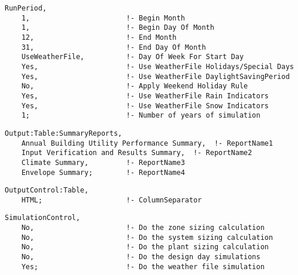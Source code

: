\begin{lstlisting}
RunPeriod,
    1,                       !- Begin Month
    1,                       !- Begin Day Of Month
    12,                      !- End Month
    31,                      !- End Day Of Month
    UseWeatherFile,          !- Day Of Week For Start Day
    Yes,                     !- Use WeatherFile Holidays/Special Days
    Yes,                     !- Use WeatherFile DaylightSavingPeriod
    No,                      !- Apply Weekend Holiday Rule
    Yes,                     !- Use WeatherFile Rain Indicators
    Yes,                     !- Use WeatherFile Snow Indicators
    1;                       !- Number of years of simulation
\end{lstlisting}

\begin{lstlisting}
Output:Table:SummaryReports,
    Annual Building Utility Performance Summary,  !- ReportName1
    Input Verification and Results Summary,  !- ReportName2
    Climate Summary,         !- ReportName3
    Envelope Summary;        !- ReportName4
\end{lstlisting}

\begin{lstlisting}
OutputControl:Table,
    HTML;                    !- ColumnSeparator
\end{lstlisting}

\begin{lstlisting}
SimulationControl,
    No,                      !- Do the zone sizing calculation
    No,                      !- Do the system sizing calculation
    No,                      !- Do the plant sizing calculation
    No,                      !- Do the design day simulations
    Yes;                     !- Do the weather file simulation
\end{lstlisting}
